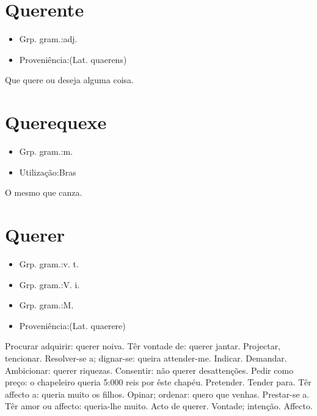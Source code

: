 \section{Querente}
\begin{itemize}
\item {Grp. gram.:adj.}
\end{itemize}
\begin{itemize}
\item {Proveniência:(Lat. \textunderscore quaerens\textunderscore )}
\end{itemize}
Que quere ou deseja alguma coisa.
\section{Querequexe}
\begin{itemize}
\item {Grp. gram.:m.}
\end{itemize}
\begin{itemize}
\item {Utilização:Bras}
\end{itemize}
O mesmo que \textunderscore canza\textunderscore .
\section{Querer}
\begin{itemize}
\item {Grp. gram.:v. t.}
\end{itemize}
\begin{itemize}
\item {Grp. gram.:V. i.}
\end{itemize}
\begin{itemize}
\item {Grp. gram.:M.}
\end{itemize}
\begin{itemize}
\item {Proveniência:(Lat. \textunderscore quaerere\textunderscore )}
\end{itemize}
Procurar adquirir: \textunderscore querer noiva\textunderscore .
Têr vontade de: \textunderscore querer jantar\textunderscore .
Projectar, tencionar.
Resolver-se a; dignar-se: \textunderscore queira attender-me\textunderscore .
Indicar.
Demandar.
Ambicionar: \textunderscore querer riquezas\textunderscore .
Consentir: \textunderscore não querer desattenções\textunderscore .
Pedir como preço: \textunderscore o chapeleiro queria 5:000 reis por êste chapéu\textunderscore .
Pretender.
Tender para.
Têr affecto a: \textunderscore queria muito os filhos\textunderscore .
Opinar; ordenar: \textunderscore quero que venhas\textunderscore .
Prestar-se a.
Têr amor ou affecto: \textunderscore queria-lhe muito\textunderscore .
Acto de querer.
Vontade; intenção.
Affecto.
